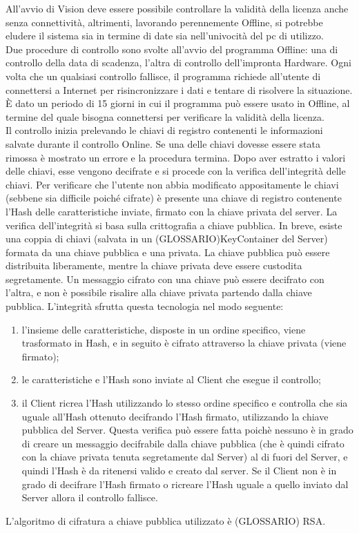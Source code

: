 All'avvio di Vision deve essere possibile controllare la validità della licenza anche senza connettività, altrimenti, lavorando perennemente Offline, si potrebbe eludere il sistema sia in termine di date sia nell'univocità del pc di utilizzo.\\
Due procedure di controllo sono svolte all'avvio del programma Offline: una di controllo della data di scadenza, l'altra di controllo dell'impronta Hardware. Ogni volta che un qualsiasi controllo fallisce, il programma richiede all'utente di connettersi a Internet per risincronizzare i dati e tentare di risolvere la situazione. È dato un periodo di 15 giorni in cui il programma può essere usato in Offline, al termine del quale bisogna connettersi per verificare la validità della licenza.\\
Il controllo inizia prelevando le chiavi di registro contenenti le informazioni salvate durante il controllo Online. Se una delle chiavi dovesse essere stata rimossa è mostrato un errore e la procedura termina. Dopo aver estratto i valori delle chiavi, esse vengono decifrate e si procede con la verifica dell’integrità delle chiavi. Per verificare che l’utente non abbia modificato appositamente le chiavi (sebbene sia difficile poiché cifrate) è presente una chiave di registro contenente l’Hash delle caratteristiche inviate, firmato con la chiave privata del server.
La verifica dell'integrità si basa sulla crittografia a chiave pubblica. In breve, esiste una coppia di chiavi (salvata in un (GLOSSARIO)KeyContainer del Server) formata da una chiave pubblica e una privata. La chiave pubblica può essere distribuita liberamente, mentre la chiave privata deve essere custodita segretamente. Un messaggio cifrato con una chiave può essere decifrato con l'altra, e non è possibile risalire alla chiave privata partendo dalla chiave pubblica. L'integrità sfrutta questa tecnologia nel modo seguente:
\begin{enumerate}
\item l'insieme delle caratteristiche, disposte in un ordine specifico, viene trasformato in Hash, e in seguito è cifrato attraverso la chiave privata (viene firmato);
\item le caratteristiche e l'Hash sono inviate al Client che esegue il controllo;
\item il Client ricrea l'Hash utilizzando lo stesso ordine specifico e controlla che sia uguale all'Hash ottenuto decifrando l'Hash firmato, utilizzando la chiave pubblica del Server. Questa verifica può essere fatta poichè nessuno è in grado di creare un messaggio decifrabile dalla chiave pubblica (che è quindi cifrato con la chiave privata tenuta segretamente dal Server) al di fuori del Server, e quindi l'Hash è da ritenersi valido e creato dal server. Se il Client non è in grado di decifrare l'Hash firmato o ricreare l'Hash uguale a quello inviato dal Server allora il controllo fallisce.
\end{enumerate}
L'algoritmo di cifratura a chiave pubblica utilizzato è (GLOSSARIO) RSA.

